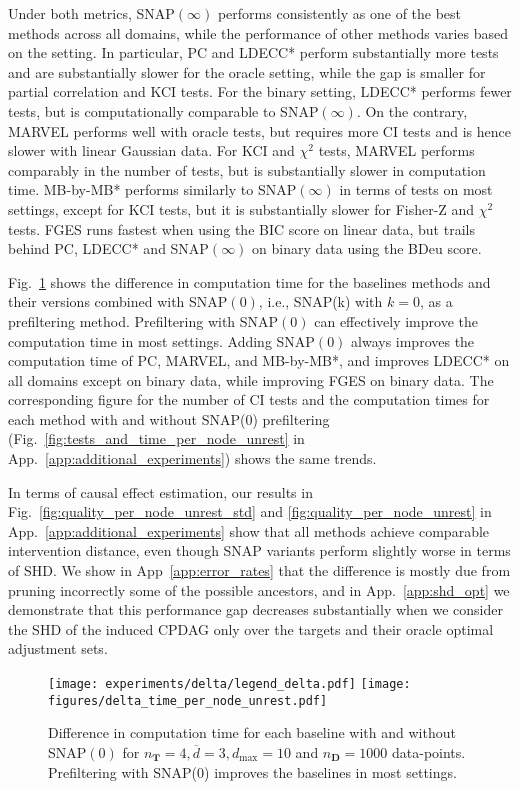 Under both metrics, SNAP$(\infty)$ performs consistently as one of the best methods across all domains, while the performance of other methods varies based on the setting. In particular, PC and LDECC* perform substantially more tests and are substantially slower for the oracle setting, while the gap is smaller for partial correlation and KCI tests. For the binary setting, LDECC* performs fewer tests, but is computationally comparable to SNAP$(\infty)$. On the contrary, MARVEL performs well with oracle tests, but requires more CI tests and is hence slower with linear Gaussian data. For KCI and $\chi^2$ tests, MARVEL performs comparably in the number of tests, but is substantially slower in  computation time. 
MB-by-MB* performs similarly to SNAP$(\infty)$ in terms of tests on most settings, except for KCI tests, but it is substantially slower for Fisher-Z and $\chi^2$ tests. FGES runs fastest when using the BIC score on linear data, but trails behind PC, LDECC* and SNAP$(\infty)$ on binary data using the BDeu score.

Fig.~\ref{fig:delta_time_per_node_unrest} shows the difference in computation time for the baselines methods and their versions combined with SNAP$(0)$, i.e., SNAP(k) with $k=0$, as a prefiltering method.
Prefiltering with SNAP$(0)$ can effectively improve the computation time in most settings.
Adding SNAP$(0)$ always improves the computation time of PC, MARVEL, and MB-by-MB*, and improves LDECC* on all domains except on binary data, while improving FGES on binary data. 
The corresponding figure for the number of CI tests and the computation times for each method with and without SNAP($0$) prefiltering (Fig.~\ref{fig:tests_and_time_per_node_unrest} in App.~\ref{app:additional_experiments}) shows the same trends.

In terms of causal effect estimation, our results in Fig.~\ref{fig:quality_per_node_unrest_std} and \ref{fig:quality_per_node_unrest} in App.~\ref{app:additional_experiments} show that all methods achieve comparable intervention distance, even though SNAP variants perform slightly worse in terms of \ac{SHD}. We show in
App~\ref{app:error_rates} that the difference is mostly due from pruning incorrectly some of the possible ancestors, and in App.~\ref{app:shd_opt} we demonstrate that this performance gap decreases substantially when we consider the \ac{SHD} of the induced CPDAG only over the targets and their oracle optimal adjustment sets.

\begin{figure}[t]
    \centering
    \texttt{[image: experiments/delta/legend\_delta.pdf]}
    \texttt{[image: figures/delta\_time\_per\_node\_unrest.pdf]}
    \caption{Difference in computation time for each baseline  with and without SNAP$(0)$ for $n_{\mathbf{T}}=4, \overline{d} = 3, d_{\max}=10$ and $n_{\mathbf{D}} = 1000$ data-points.
    Prefiltering with SNAP($0$) improves the baselines in most settings.
    \label{fig:delta_time_per_node_unrest}
    }    
\end{figure}



